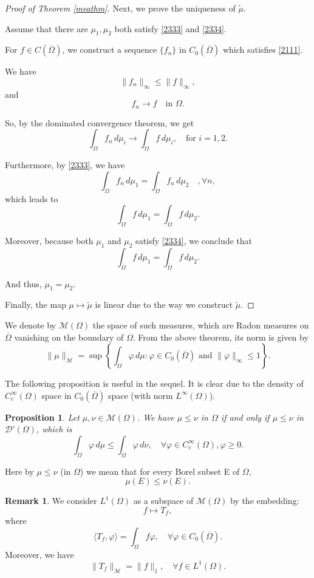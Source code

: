 \documentclass[a4paper, 11pt]{report}
\newtheorem{prn}{Proposition}[chapter]
\theoremstyle{definition}\newtheorem*{rmk}{Remark}
\begin{document}
\begin{proof}[Proof of Theorem \ref{meathm}]
Next, we prove the uniqueness of $\tilde{\mu}$.

Assume that there are $\mu_1, \mu_2$ both satisfy \eqref{2333} and \eqref{2334}.

For $f \in C(\overline{\Omega})$, we construct a sequence $\{f_n\}$ in $C_0(\overline{\Omega})$ which satisfies \eqref{2111}.

We have
\[
\| f_n \|_{\infty} \le \| f\|_{\infty},
\]
and
\[
f_n \to f \quad \text{in }\Omega.
\]

So, by the dominated convergence theorem, we get
\[
\int_{\Omega}f_n \,d\mu_i \to \int_{\Omega}f \, d\mu_i,\quad \text{for }i=1,2.
\]

Furthermore, by \eqref{2333}, we have
\[
\int_{\Omega}f_n \,d\mu_1 = \int_{\Omega}f_n \, d\mu_2\quad, \forall n,
\]
which leads to
\[
\int_{\Omega}f \,d\mu_1 = \int_{\Omega}f \, d\mu_2.
\]

Moreover, because both $\mu_1$ and $ \mu_2$ satisfy \eqref{2334}, we conclude that
\[
\int_{\overline{\Omega}}f \,d\mu_1 = \int_{\overline{\Omega}}f \, d\mu_2.
\]

And thus, $\mu_1 =\mu_2$.

Finally, the map $\mu \mapsto \tilde{\mu}$ is linear due to the way we construct $\tilde{\mu}$.
\end{proof}

We denote by $\mathcal{M}(\Omega)$ the space of such measures, which are Radon measures on $\overline{\Omega}$ vanishing on the boundary of $\Omega$. From the above theorem, its norm is given by
\[
\| \mu \|_{\mathcal{M}} = \sup \left\{\int_\Omega \varphi \, d\mu : \varphi \in C_0(\overline{\Omega}) \text{ and } \|\varphi\|_{\infty} \le 1\right\}.
\]

The following proposition is useful in the sequel. It is clear due to the density of $C_c^{\infty}(\Omega)$ space in $C_0(\overline{\Omega})$ space (with norm $L^{\infty}(\Omega)$).

\begin{prn}\label{21prn}
Let $\mu, \nu \in \mathcal{M}(\Omega)$. We have $\mu \leq \nu$ in $\Omega$ if and only if $\mu \leq \nu$ in $\mathcal{D}'(\Omega)$, which is
\[
\int_{\Omega}\varphi\,d\mu \leq \int_{\Omega}\varphi\,d\nu,\quad\forall \varphi \in C_c^{\infty}(\Omega),\varphi \geq 0.
\]
\end{prn}

Here by $\mu \le \nu$ (in $\Omega$) we mean that for every Borel subset E of $\Omega$,
\[
\mu(E) \le \nu(E).
\]

\begin{rmk}
We consider $L^1(\Omega)$ as a subspace of $\mathcal{M}(\Omega)$ by the embedding:
\begin{equation}\label{L12M}
f \mapsto T_f,
\end{equation}
where 
\[
\langle T_f, \varphi \rangle = \int_{\Omega}f\varphi, \quad\forall \varphi \in C_0(\overline{\Omega}).
\]
Moreover, we have
\[
\|T_f\|_{\mathcal{M}} = \| f \|_1, \quad \forall f \in L^1(\Omega).
\]
\end{rmk}
\end{document}
